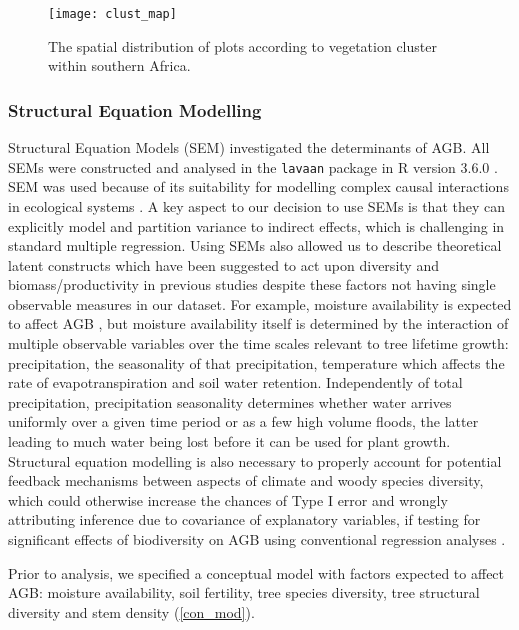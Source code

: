 \documentclass[11pt,a4paper]{article}
\begin{document}
\begin{landscape}



\begin{figure}[H]
\centering
	\texttt{[image: clust\_map]}
	\caption{The spatial distribution of plots according to vegetation cluster within southern Africa.}
	\label{clust_map}
\end{figure}
\end{landscape}

\subsubsection{Structural Equation Modelling}

Structural Equation Models (SEM) investigated the determinants of AGB. All SEMs were constructed and analysed in the \verb|lavaan| package \citep{lavaan} in R version 3.6.0 \citep{R2019}. SEM was used because of its suitability for modelling complex causal interactions in ecological systems \citep{Lee2007}. A key aspect to our decision to use SEMs is that they can explicitly model and partition variance to indirect effects, which is challenging in standard multiple regression. Using SEMs also allowed us to describe theoretical latent constructs which have been suggested to act upon diversity and biomass/productivity in previous studies despite these factors not having single observable measures in our dataset. For example, moisture availability is expected to affect AGB \citep{Saito2014, Campbell1996}, but moisture availability itself is determined by the interaction of multiple observable variables over the time scales relevant to tree lifetime growth: precipitation, the seasonality of that precipitation, temperature which affects the rate of evapotranspiration and soil water retention. Independently of total precipitation, precipitation seasonality determines whether water arrives uniformly over a given time period or as a few high volume floods, the latter leading to much water being lost before it can be used for plant growth. Structural equation modelling is also necessary to properly account for potential feedback mechanisms between aspects of climate and woody species diversity, which could otherwise increase the chances of Type I error and wrongly attributing inference due to covariance of explanatory variables, if testing for significant effects of biodiversity on AGB using conventional regression analyses \citep{Nachtigall2003}.

Prior to analysis, we specified a conceptual model with factors expected to affect AGB: moisture availability, soil fertility, tree species diversity, tree structural diversity and stem density (\autoref{con_mod}). 
\end{document}
